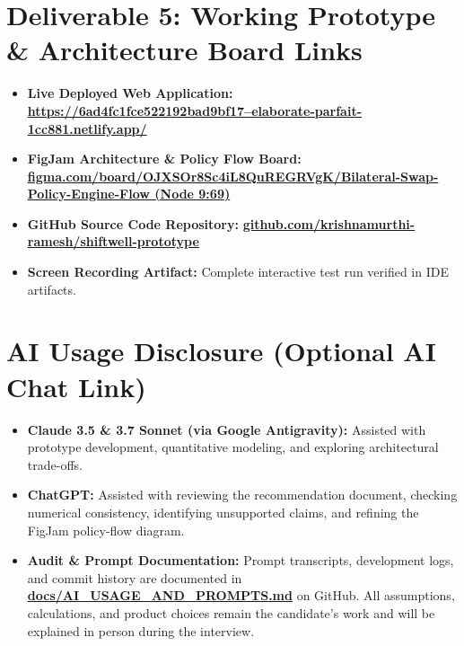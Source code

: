 \documentclass[10pt,a4paper]{article}
\begin{document}
\vspace{-3mm}
\section*{Deliverable 5: Working Prototype \& Architecture Board Links}
\begin{neutralcard}
\footnotesize
\begin{itemize}[itemsep=0.8pt,topsep=0.8pt]
    \item \textbf{Live Deployed Web Application:} \href{https://6ad4fc1fce522192bad9bf17--elaborate-parfait-1cc881.netlify.app/}{\bfseries\color{LinkBlue}https://6ad4fc1fce522192bad9bf17--elaborate-parfait-1cc881.netlify.app/}
    \item \textbf{FigJam Architecture \& Policy Flow Board:} \href{https://www.figma.com/board/OJXSOr8Sc4iL8QuREGRVgK/Bilateral-Swap-Policy-Engine-Flow?node-id=9-69}{\bfseries\color{LinkBlue}figma.com/board/OJXSOr8Sc4iL8QuREGRVgK/Bilateral-Swap-Policy-Engine-Flow (Node 9:69)}
    \item \textbf{GitHub Source Code Repository:} \href{https://github.com/krishnamurthi-ramesh/shiftwell-prototype}{\bfseries\color{LinkBlue}github.com/krishnamurthi-ramesh/shiftwell-prototype}
    \item \textbf{Screen Recording Artifact:} Complete interactive test run verified in IDE artifacts.
\end{itemize}
\end{neutralcard}

\vspace{-2.5mm}
\section*{AI Usage Disclosure (Optional AI Chat Link)}
\begin{neutralcard}
\footnotesize
\begin{itemize}[itemsep=0.8pt,topsep=0.8pt]
    \item \textbf{Claude 3.5 \& 3.7 Sonnet (via Google Antigravity):} Assisted with prototype development, quantitative modeling, and exploring architectural trade-offs.
    \item \textbf{ChatGPT:} Assisted with reviewing the recommendation document, checking numerical consistency, identifying unsupported claims, and refining the FigJam policy-flow diagram.
    \item \textbf{Audit \& Prompt Documentation:} Prompt transcripts, development logs, and commit history are documented in \href{https://github.com/krishnamurthi-ramesh/shiftwell-prototype/blob/main/docs/AI_USAGE_AND_PROMPTS.md}{\bfseries\color{LinkBlue}docs/AI\_USAGE\_AND\_PROMPTS.md} on GitHub. All assumptions, calculations, and product choices remain the candidate's work and will be explained in person during the interview.
\end{itemize}
\end{neutralcard}
\end{document}
